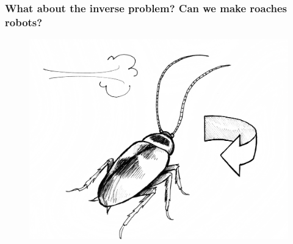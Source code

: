\documentclass[compress]{beamer}
\begin{document}
\begin{frame}
  \frametitle{What about the inverse problem? Can we make roaches robots?}
  \begin{figure}
    \includegraphics[width=0.8\linewidth]{wind.jpg}
  \end{figure}     
\end{frame}
\end{document}

